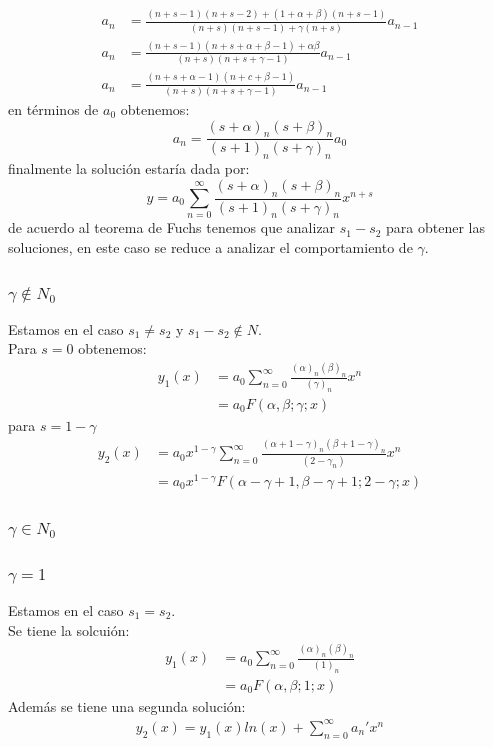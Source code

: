 \documentclass{article}
\begin{document}
\begin{tcolorbox}[breakable]
\begin{align*}
        a_n &= \frac{(n+s-1)(n+s-2)+(1+\alpha+\beta)(n+s-1)}{(n+s)(n+s-1) + \gamma(n+s)}a_{n-1} \\
        a_n &= \frac{(n+s-1)(n+s+\alpha+\beta-1)+\alpha \beta}{(n+s)(n+s+\gamma-1)}a_{n-1} \\
        a_n &= \frac{(n+s+\alpha-1)(n+c+\beta - 1)}{(n+s)(n+s+\gamma-1)}a_{n-1} 
    \end{align*}
    en términos de $a_0$ obtenemos:
    \[ a_n = \frac{(s+\alpha)_n(s+\beta)_n}{(s+1)_n(s+\gamma)_n}a_0 \]
    finalmente la solución estaría dada por:
    \[ y = a_0 \sum_{n=0}^\infty \frac{(s+\alpha)_n(s+\beta)_n}{(s+1)_n(s+\gamma)_n} x^{n+s} \]
    de acuerdo al teorema de Fuchs tenemos que analizar $s_1-s_2$ para obtener las soluciones, en este 
    caso se reduce a analizar el comportamiento de $\gamma$.
    \subsubsection*{$\gamma \notin N_0$}
    Estamos en el caso $s_1 \neq s_2$ y $s_1-s_2 \notin N$. \\
    Para $s=0$ obtenemos:
    \begin{align*}
        y_1(x)
        &= a_0\sum_{n=0}^\infty \frac{(\alpha)_n (\beta)_n}{(\gamma)_n}x^{n} \\
        &= a_0F(\alpha, \beta; \gamma; x) 
    \end{align*}
    para $s=1-\gamma$
    \begin{align*}
        y_2(x)
        &= a_0x^{1-\gamma} \sum_{n=0}^\infty \frac{(\alpha+1-\gamma)_n(\beta + 1 - \gamma)_n}{(2-\gamma_n)}x^n \\
        &= a_0x^{1-\gamma}F(\alpha-\gamma+1, \beta-\gamma+1; 2-\gamma; x)
    \end{align*}
    \subsubsection*{$\gamma \in N_0$}
    \subsubsection*{$\gamma = 1$}
    Estamos en el caso $s_1=s_2$. \\
    Se tiene la solcuión:
    \begin{align*}
        y_1(x) 
        &= a_0 \sum_{n=0}^\infty \frac{(\alpha)_n (\beta)_n}{(1)_n} \\
        &= a_0 F(\alpha,\beta;1;x)
    \end{align*}
    Además se tiene una segunda solución:
    \begin{align*}
        y_2(x) = y_1(x)ln(x) + \sum_{n=0}^\infty a_n' x^{n}
    \end{align*}

\end{tcolorbox}
\end{document}
